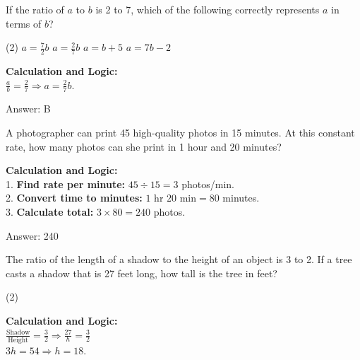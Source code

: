 \documentclass[11pt,paper=a4,answers]{exam}
\begin{document}
\begin{questions}
\question
If the ratio of $a$ to $b$ is 2 to 7, which of the following correctly represents $a$ in terms of $b$?
\begin{tasks}(2)
    \task $a = \frac{7}{2}b$
    \task $a = \frac{2}{7}b$
    \task $a = b + 5$
    \task $a = 7b - 2$
\end{tasks}

\begin{solution}
\textbf{Calculation and Logic:} \\
$\frac{a}{b} = \frac{2}{7} \Rightarrow a = \frac{2}{7}b$.

\vspace{30pt}

Answer: \colorbox{yellow!100}{B}
\end{solution}

\vspace{60pt}

\question
A photographer can print 45 high-quality photos in 15 minutes. At this constant rate, how many photos can she print in 1 hour and 20 minutes?

\begin{solution}
\textbf{Calculation and Logic:} \\
1. \textbf{Find rate per minute:} $45 \div 15 = 3$ photos/min. \\
2. \textbf{Convert time to minutes:} $1 \text{ hr } 20 \text{ min} = 80$ minutes. \\
3. \textbf{Calculate total:} $3 \times 80 = 240$ photos.

\vspace{30pt}

Answer: \colorbox{yellow!100}{240}
\end{solution}

\vspace{60pt}

\question
The ratio of the length of a shadow to the height of an object is 3 to 2. If a tree casts a shadow that is 27 feet long, how tall is the tree in feet?
\begin{tasks}(2)
\end{tasks}

\begin{solution}
\textbf{Calculation and Logic:} \\
$\frac{\text{Shadow}}{\text{Height}} = \frac{3}{2} \Rightarrow \frac{27}{h} = \frac{3}{2}$ \\
$3h = 54 \Rightarrow h = 18$.


\end{solution}
\end{questions}
\end{document}
